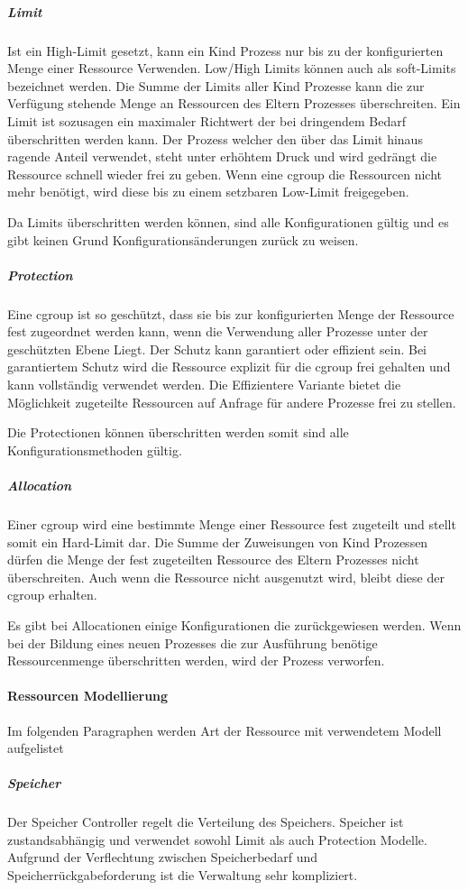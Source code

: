 \subparagraph{Limit}
Ist ein High-Limit gesetzt, kann ein Kind Prozess nur bis zu der konfigurierten Menge einer Ressource Verwenden. Low/High Limits können auch als soft-Limits bezeichnet werden. Die Summe der Limits aller Kind Prozesse kann die zur Verfügung stehende Menge an Ressourcen des Eltern Prozesses überschreiten. Ein Limit ist sozusagen ein maximaler Richtwert der bei dringendem Bedarf überschritten werden kann. Der Prozess welcher den über das Limit hinaus ragende Anteil verwendet, steht unter erhöhtem Druck und wird gedrängt die Ressource schnell wieder frei zu geben. Wenn eine cgroup die Ressourcen nicht mehr benötigt, wird diese bis zu einem setzbaren Low-Limit freigegeben.

Da Limits überschritten werden können, sind alle Konfigurationen gültig und es gibt keinen Grund Konfigurationsänderungen zurück zu weisen.

\subparagraph{Protection}
Eine cgroup ist so geschützt, dass sie bis zur konfigurierten Menge der Ressource fest zugeordnet werden kann, wenn die Verwendung aller Prozesse unter der geschützten Ebene Liegt. Der Schutz kann garantiert oder effizient sein. Bei garantiertem Schutz wird die Ressource explizit für die cgroup frei gehalten und kann vollständig verwendet werden. Die Effizientere Variante bietet die Möglichkeit zugeteilte Ressourcen auf Anfrage für andere Prozesse frei zu stellen.

Die Protectionen können überschritten werden somit sind alle Konfigurationsmethoden gültig.

\subparagraph{Allocation}
Einer cgroup wird eine bestimmte Menge einer Ressource fest zugeteilt und stellt somit ein Hard-Limit dar. Die Summe der Zuweisungen von Kind Prozessen dürfen die Menge der fest zugeteilten Ressource des Eltern Prozesses nicht überschreiten. Auch wenn die Ressource nicht ausgenutzt wird, bleibt diese der cgroup erhalten. 

Es gibt bei Allocationen einige Konfigurationen die zurückgewiesen werden. Wenn bei der Bildung eines neuen Prozesses die zur Ausführung benötige Ressourcenmenge überschritten werden, wird der Prozess verworfen.

\paragraph{Ressourcen Modellierung}
Im folgenden Paragraphen werden Art der Ressource mit verwendetem Modell aufgelistet

\subparagraph{Speicher}
Der Speicher Controller regelt die Verteilung des Speichers. Speicher ist zustandsabhängig und verwendet sowohl Limit als auch Protection Modelle. Aufgrund der Verflechtung zwischen Speicherbedarf und Speicherrückgabeforderung ist die Verwaltung sehr kompliziert.

